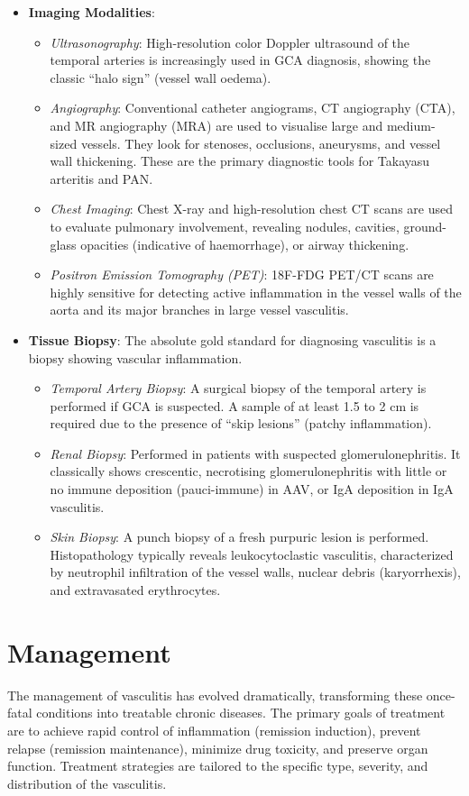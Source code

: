 \begin{itemize}
\begin{itemize}
  \end{itemize}
\item \textbf{Imaging Modalities}:
  \begin{itemize}
  \item \textit{Ultrasonography}: High-resolution color Doppler ultrasound of the temporal arteries is increasingly used in GCA diagnosis, showing the classic ``halo sign'' (vessel wall oedema).
  \item \textit{Angiography}: Conventional catheter angiograms, CT angiography (CTA), and MR angiography (MRA) are used to visualise large and medium-sized vessels. They look for stenoses, occlusions, aneurysms, and vessel wall thickening. These are the primary diagnostic tools for Takayasu arteritis and PAN.
  \item \textit{Chest Imaging}: Chest X-ray and high-resolution chest CT scans are used to evaluate pulmonary involvement, revealing nodules, cavities, ground-glass opacities (indicative of haemorrhage), or airway thickening.
  \item \textit{Positron Emission Tomography (PET)}: 18F-FDG PET/CT scans are highly sensitive for detecting active inflammation in the vessel walls of the aorta and its major branches in large vessel vasculitis.
  \end{itemize}
\item \textbf{Tissue Biopsy}: The absolute gold standard for diagnosing vasculitis is a biopsy showing vascular inflammation.
  \begin{itemize}
  \item \textit{Temporal Artery Biopsy}: A surgical biopsy of the temporal artery is performed if GCA is suspected. A sample of at least 1.5 to 2 cm is required due to the presence of ``skip lesions'' (patchy inflammation).
  \item \textit{Renal Biopsy}: Performed in patients with suspected glomerulonephritis. It classically shows crescentic, necrotising glomerulonephritis with little or no immune deposition (pauci-immune) in AAV, or IgA deposition in IgA vasculitis.
  \item \textit{Skin Biopsy}: A punch biopsy of a fresh purpuric lesion is performed. Histopathology typically reveals leukocytoclastic vasculitis, characterized by neutrophil infiltration of the vessel walls, nuclear debris (karyorrhexis), and extravasated erythrocytes.
  \end{itemize}
\end{itemize}

\section*{Management}
The management of vasculitis has evolved dramatically, transforming these once-fatal conditions into treatable chronic diseases. The primary goals of treatment are to achieve rapid control of inflammation (remission induction), prevent relapse (remission maintenance), minimize drug toxicity, and preserve organ function. Treatment strategies are tailored to the specific type, severity, and distribution of the vasculitis.

